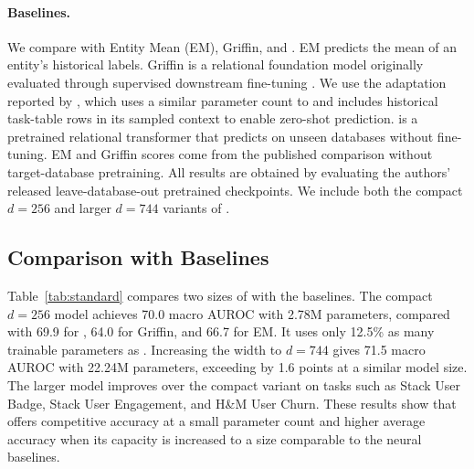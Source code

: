 \paragraph{Baselines.}
We compare \model{} with Entity Mean (EM), Griffin, and \RT{}. EM predicts
the mean of an entity's historical labels. Griffin is a relational foundation
model originally evaluated through supervised downstream fine-tuning
\citep{wang2025griffin}. We use the adaptation reported by \citet{ranjan2026rt},
which uses a similar parameter count to \RT{} and includes historical task-table
rows in its sampled context to enable zero-shot prediction. \RT{} is a
pretrained relational transformer that predicts on unseen databases without
fine-tuning. EM and Griffin scores come from the published \RT{} comparison
without target-database pretraining. All \RT{} results are obtained by
evaluating the authors' released leave-database-out pretrained checkpoints.
We include both the compact
$d=256$ and larger $d=744$ variants of \model{}.

\subsection{Comparison with Baselines}
\label{sec:standard_results}

Table~\ref{tab:standard} compares two sizes of \model{} with the baselines.
The compact $d=256$ model achieves 70.0 macro AUROC with 2.78M parameters,
compared with 69.9 for \RT{}, 64.0 for Griffin, and 66.7 for EM. It uses
only 12.5\% as many trainable parameters as \RT{}. Increasing the width to
$d=744$ gives 71.5 macro AUROC with 22.24M parameters, exceeding \RT{} by
1.6 points at a similar model size. The larger model improves over the
compact variant on tasks such as Stack User Badge, Stack User Engagement,
and H\&M User Churn. These results show that \model{} offers competitive
accuracy at a small parameter count and higher average accuracy when its
capacity is increased to a size comparable to the neural baselines.

